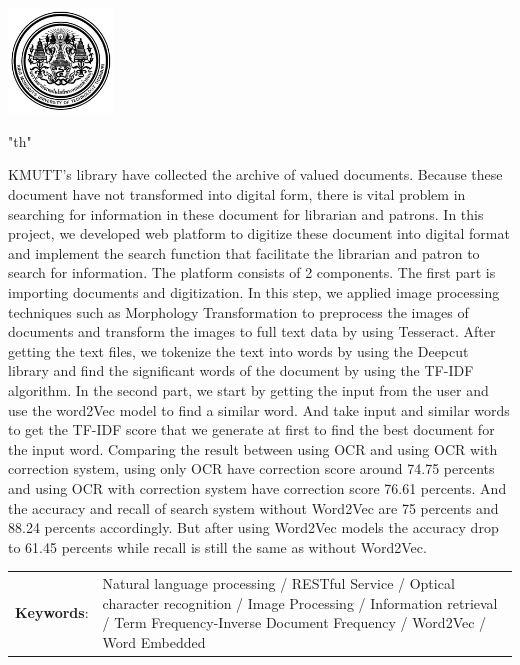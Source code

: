 \documentclass[12pt,oneside,openright,a4paper]{cpe-thai-project}
\begin{document}
\pdfstringdefDisableCommands{%
\let\MakeUppercase\relax
}
\begin{center}
\includegraphics[width=2.8cm]{logo02.jpg}
\end{center}
\vspace*{-1cm}
\maketitlepage
\makesignaturepage 
\XeTeXlinebreaklocale "th"	
\emergencystretch=10pt %
\abstract

KMUTT's library have collected the archive of valued documents. 
Because these document have not transformed into digital form, 
there is vital problem in searching for information in these 
document for librarian and patrons. In this project, we developed 
web platform to digitize these document into digital format 
and implement the search function that facilitate the librarian 
and patron to search for information. The platform consists of 
2 components. The first part is importing documents and 
digitization. In this step, we applied image processing 
techniques such as Morphology Transformation to preprocess
the images of documents and transform the images to full text 
data by using Tesseract. After getting the text files, we tokenize 
the text into words by using the Deepcut library and find the 
significant words of the document by using the TF-IDF algorithm. 
In the second part, we start by getting the input from the user 
and use the word2Vec model to find a similar word. And take 
input and similar words to get the TF-IDF score that we 
generate at first to find the best document for the input word.  
Comparing the result between using OCR and using OCR with correction system, 
using only OCR have correction score around 74.75 percents and using OCR with correction system
have correction score 76.61 percents.
And the accuracy and recall of search system without Word2Vec are 75 percents and 88.24 percents accordingly.
But after using Word2Vec models the accuracy drop to 61.45 percents while recall is still the same as without Word2Vec.

\begin{flushleft}
\begin{tabular*}{\textwidth}{@{}lp{}}
\textbf{Keywords}: & Natural language processing / RESTful Service / Optical character recognition / Image Processing / Information retrieval / Term Frequency-Inverse Document Frequency / Word2Vec / Word Embedded 
\end{tabular*}
\end{flushleft}
\endabstract
\end{document}
